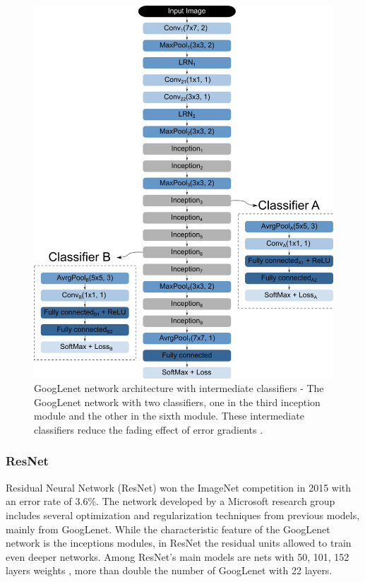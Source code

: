 \begin{figure}
    \centering
    \includegraphics[scale=0.4]{"Part 3 - Learning Systems/Supervised Learning/Deep Learning/images/figure134.png"}
    \caption{GoogLenet network architecture with intermediate classifiers - The GoogLenet network with two classifiers, one in the third inception module and the other in the sixth module. These intermediate classifiers reduce the fading effect of error gradients \cite{img:googlenet}.}
    \label{fig:googlenet2}
\end{figure}

\subsubsection{ResNet}
Residual Neural Network (ResNet) won the ImageNet competition in 2015 with an error rate of 3.6\%. The network developed by a Microsoft research group includes several optimization and regularization techniques from previous models, mainly from GoogLenet. While the characteristic feature of the GoogLenet network is the inceptions modules, in ResNet the residual units allowed to train even deeper networks. Among ResNet's main models are nets with 50, 101, 152 layers weights \cite{elgendy2020}, more than double the number of GoogLenet with 22 layers.

